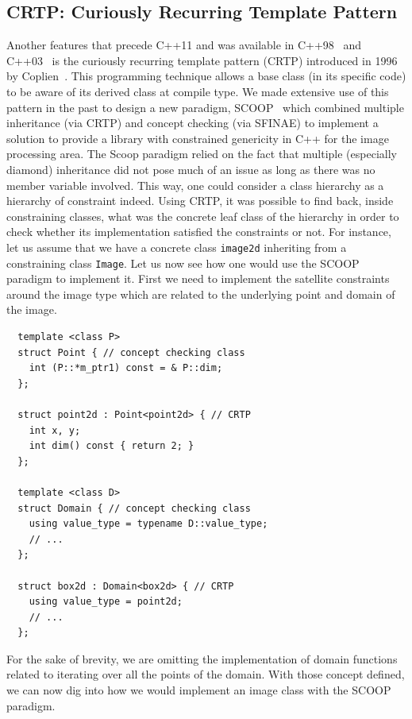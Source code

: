 \subsection{CRTP: Curiously Recurring Template Pattern}
\label{subsec:crtp}

Another features that precede C++11 and was available in C++98~\parencite{iso.1998.cpp} and
C++03~\parencite{iso.2003.cpp} is the curiously recurring template pattern (CRTP) introduced in 1996 by
Coplien~\parencite{coplien.1996.crtp}. This programming technique allows a base class (in its specific code) to be aware
of its derived class at compile type. We made extensive use of this pattern in the past to design a new paradigm,
SCOOP~\parencite{burrus.2003.mpool, geraud.2006.scoop-pres, geraud.2008.mpool, levillain.2011.phd} which combined
multiple inheritance (via CRTP) and concept checking (via SFINAE) to implement a solution to provide a library with
constrained genericity in C++ for the image processing area. The Scoop paradigm relied on the fact that multiple
(especially diamond) inheritance did not pose much of an issue as long as there was no member variable involved. This
way, one could consider a class hierarchy as a hierarchy of constraint indeed. Using CRTP, it was possible to find back,
inside constraining classes, what was the concrete leaf class of the hierarchy in order to check whether its
implementation satisfied the constraints or not. For instance, let us assume that we have a concrete class
\texttt{image2d} inheriting from a constraining class \texttt{Image}. Let us now see how one would use the SCOOP
paradigm to implement it. First we need to implement the satellite constraints around the image type which are related
to the underlying point and domain of the image.

\begin{verbatim}
  template <class P>
  struct Point { // concept checking class
    int (P::*m_ptr1) const = & P::dim;
  };

  struct point2d : Point<point2d> { // CRTP
    int x, y;
    int dim() const { return 2; }
  };

  template <class D>
  struct Domain { // concept checking class
    using value_type = typename D::value_type;
    // ...
  };

  struct box2d : Domain<box2d> { // CRTP
    using value_type = point2d;
    // ...
  };
\end{verbatim}

For the sake of brevity, we are omitting the implementation of domain functions related to iterating over all the points
of the domain. With those concept defined, we can now dig into how we would implement an image class with the SCOOP
paradigm.

